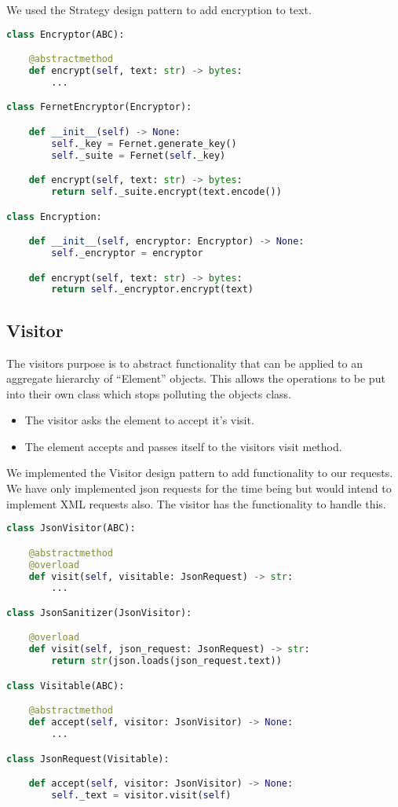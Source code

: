 We used the Strategy design pattern to add encryption to text.


\begin{lstlisting}[language=Python]
class Encryptor(ABC):

	@abstractmethod
	def encrypt(self, text: str) -> bytes:
		...

class FernetEncryptor(Encryptor):

	def __init__(self) -> None:
		self._key = Fernet.generate_key()
		self._suite = Fernet(self._key)

	def encrypt(self, text: str) -> bytes:
		return self._suite.encrypt(text.encode())

class Encryption:

	def __init__(self, encryptor: Encryptor) -> None:
		self._encryptor = encryptor

	def encrypt(self, text: str) -> bytes:
		return self._encryptor.encrypt(text)
\end{lstlisting}

\subsection{Visitor}
The visitors purpose is to abstract functionality that can be applied to an aggregate hierarchy of ``Element'' objects. \cite{sourcemaking} This allows the operations to be put into their own class which stops polluting the objects class.
\begin{itemize}
	\item The visitor asks the element to accept it's visit.
	\item The element accepts and passes itself to the visitors visit method.
\end{itemize}

We implemented the Visitor design pattern to add functionality to our requests. We have only implemented json
requests for the time being but would intend to implement XML requests also. The visitor has the functionality
to handle this.

\begin{lstlisting}[language=Python]
class JsonVisitor(ABC):

	@abstractmethod
	@overload
	def visit(self, visitable: JsonRequest) -> str:
		...

class JsonSanitizer(JsonVisitor):

	@overload
	def visit(self, json_request: JsonRequest) -> str:
		return str(json.loads(json_request.text))

class Visitable(ABC):

	@abstractmethod
	def accept(self, visitor: JsonVisitor) -> None:
		...

class JsonRequest(Visitable):

	def accept(self, visitor: JsonVisitor) -> None:
		self._text = visitor.visit(self)

\end{lstlisting}

